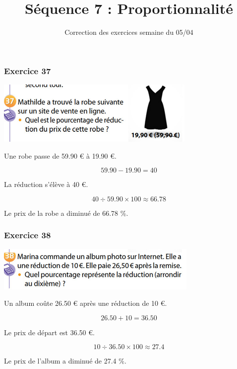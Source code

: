 \documentclass[xcolor={dvipsnames}]{beamer}
\title{Séquence 7 : Proportionnalité}
\subtitle{Correction des exercices semaine du 05/04}
\begin{document}
\begin{frame}
  \titlepage 
\end{frame}

	
\begin{frame}
	\frametitle{Exercice 37}
	
	\begin{center}
		\includegraphics[scale=0.8]{ex37}
	\end{center}
	
	Une robe passe de \num{59.90} € à \num{19.90} €. \pause
	
	\begin{equation*}
		\num{59.90} - \num{19.90} = \num{40} 
	\end{equation*}

	La réduction s'élève à 40 €. \pause
	
	\begin{equation*}
		40 \div \num{59.90} \times 100 \approx \num{66.78} 
	\end{equation*}		
	
	Le prix de la robe a diminué de \num{66.78} \%.
\end{frame}


\begin{frame}
	\frametitle{Exercice 38}
	
	\begin{center}
		\includegraphics[scale=0.8]{ex38}
	\end{center}
	
	Un album coûte  \num{26.50} € après une réduction de 10 €.
	
	\begin{equation*}
		\num{26.50} + \num{10} = \num{36.50} 
	\end{equation*}
	
	Le prix de départ est \num{36.50}  €. \pause
	
	\begin{equation*}
		10 \div \num{36.50} \times 100 \approx \num{27.4} 
	\end{equation*}		
	
	Le prix de l'album a diminué de \num{27.4} \%.
\end{frame}
\end{document}
